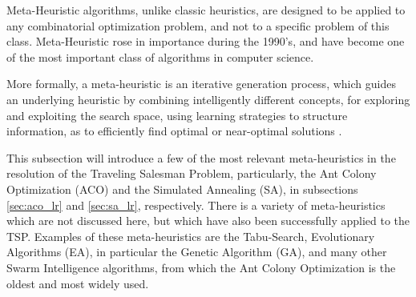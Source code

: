 Meta-Heuristic algorithms, unlike classic heuristics, are designed to be applied to any combinatorial optimization problem, and not to a specific problem of this class. Meta-Heuristic rose in importance during the 1990's, and have become one of the most important class of algorithms in computer science.

More formally, a meta-heuristic is an iterative generation process, which guides an underlying heuristic by combining intelligently different concepts, for exploring and exploiting the search space, using learning strategies to structure information, as to efficiently find optimal or near-optimal solutions \cite{metaheuristics_overview}.

This subsection will introduce a few of the most relevant meta-heuristics in the resolution of the Traveling Salesman Problem, particularly, the Ant Colony Optimization (ACO) and the Simulated Annealing (SA), in subsections \ref{sec:aco_lr} and \ref{sec:sa_lr}, respectively. There is a variety of meta-heuristics which are not discussed here, but which have also been successfully applied to the TSP. Examples of these meta-heuristics are the Tabu-Search, Evolutionary Algorithms (EA), in particular the Genetic Algorithm (GA), and many other Swarm Intelligence algorithms, from which the Ant Colony Optimization is the oldest and most widely used.
